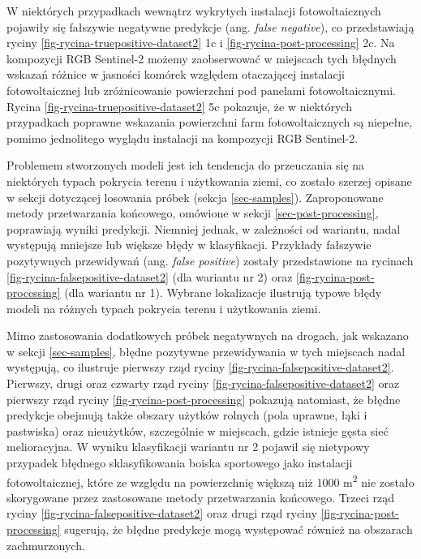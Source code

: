 \documentclass{amuthesis}
\begin{document}
W niektórych przypadkach wewnątrz wykrytych instalacji fotowoltaicznych
pojawiły się fałszywie negatywne predykcje (ang. \emph{false negative}),
co przedstawiają ryciny \ref{fig-rycina-truepositive-dataset2} 1c i
\ref{fig-rycina-post-processing} 2c. Na kompozycji RGB Sentinel-2 możemy
zaobserwować w miejscach tych błędnych wskazań różnice w jasności
komórek względem otaczającej instalacji fotowoltaicznej lub
zróżnicowanie powierzchni pod panelami fotowoltaicznymi. Rycina
\ref{fig-rycina-truepositive-dataset2} 5c pokazuje, że w niektórych
przypadkach poprawne wskazania powierzchni farm fotowoltaicznych są
niepełne, pomimo jednolitego wyglądu instalacji na kompozycji RGB
Sentinel-2.

Problemem stworzonych modeli jest ich tendencja do przeuczania się na
niektórych typach pokrycia terenu i użytkowania ziemi, co zostało
szerzej opisane w sekcji dotyczącej losowania próbek (sekcja
\ref{sec-samples}). Zaproponowane metody przetwarzania końcowego,
omówione w sekcji \ref{sec-post-processing}, poprawiają wyniki
predykcji. Niemniej jednak, w zależności od wariantu, nadal występują
mniejsze lub większe błędy w klasyfikacji. Przykłady fałszywie
pozytywnych przewidywań (ang. \emph{false positive}) zostały
przedstawione na rycinach \ref{fig-rycina-falsepositive-dataset2} (dla
wariantu nr 2) oraz \ref{fig-rycina-post-processing} (dla wariantu nr
1). Wybrane lokalizacje ilustrują typowe błędy modeli na różnych typach
pokrycia terenu i użytkowania ziemi.

Mimo zastosowania dodatkowych próbek negatywnych na drogach, jak
wskazano w sekcji \ref{sec-samples}, błędne pozytywne przewidywania w
tych miejscach nadal występują, co ilustruje pierwszy rząd ryciny
\ref{fig-rycina-falsepositive-dataset2}. Pierwszy, drugi oraz czwarty
rząd ryciny \ref{fig-rycina-falsepositive-dataset2} oraz pierwszy rząd
ryciny \ref{fig-rycina-post-processing} pokazują natomiast, że błędne
predykcje obejmują także obszary użytków rolnych (pola uprawne, łąki i
pastwiska) oraz nieużytków, szczególnie w miejscach, gdzie istnieje
gęsta sieć melioracyjna. W wyniku klasyfikacji wariantu nr 2 pojawił się
nietypowy przypadek błędnego sklasyfikowania boiska sportowego jako
instalacji fotowoltaicznej, które ze względu na powierzchnię większą niż
1000 m\textsuperscript{2} nie zostało skorygowane przez zastosowane
metody przetwarzania końcowego. Trzeci rząd ryciny
\ref{fig-rycina-falsepositive-dataset2} oraz drugi rząd ryciny
\ref{fig-rycina-post-processing} sugerują, że błędne predykcje mogą
występować również na obszarach zachmurzonych.
\end{document}
